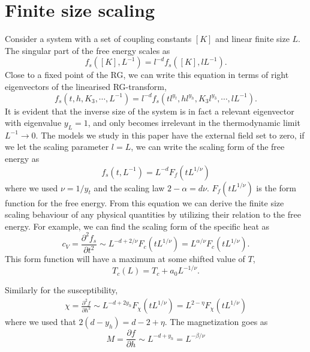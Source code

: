 \section{Finite size scaling}
Consider a system with a set of coupling constants $[K]$ and linear finite size $L$. 
The singular part of the free energy scales as
\begin{equation}
  f_s([K],L^{-1}) = l^{-d}f_s([K],lL^{-1}).
  \label{}
\end{equation}
Close to a fixed point of the RG, we can write this equation in terms of right eigenvectors of the linearised RG-transform,
\begin{equation}
  f_s(t,h,K_3,\cdots,L^{-1}) = l^{-d}f_s(tl^{y_t},hl^{y_h},K_3 l^{y_3},\cdots,lL^{-1}).
  \label{}
\end{equation}
It is evident that the inverse size of the system is in fact a relevant eigenvector with eigenvalue $y_L = 1$, and only becomes irrelevant in the thermodynamic limit $L^{-1}\rightarrow 0$.
The models we study in this paper have the external field set to zero, if we let the scaling parameter $l = L$, we can write the scaling form of the free energy as
\begin{equation}
  f_s(t,L^{-1}) = L^{-d} F_f(t L^{1/\nu})
  \label{}
\end{equation}
where we used $\nu = 1/y_t$ and the scaling law $2 -\alpha = d\nu$.
$F_f(tL^{1/\nu})$ is the form function for the free energy.
From this equation we can derive the finite size scaling behaviour of any physical quantities by utilizing their relation to the free energy. 
For example, we can find the scaling form of the specific heat as
\begin{equation}
  c_V = \frac{\partial ^2 f_s}{\partial t^2} \sim L^{-d +2/\nu}F_{c}(tL^{1/\nu}) = L^{\alpha/\nu} F_{c}(tL^{1/\nu}).
  \label{}
\end{equation}
This form function will have a maximum at some shifted value of $T$, 
\begin{equation}
  T_c(L) = T_c +  a_0 L^{-1/\nu}.
  \label{}
\end{equation}


Similarly for the susceptibility,
\begin{align}
  \chi = \frac{\partial^2 f}{\partial h^2}
  \sim L^{-d +2y_h}F_{\chi}(tL^{1/\nu}) = L^{2-\eta}F_{\chi}(tL^{1/\nu})
  \label{}
\end{align}
where we used that $ 2(d-y_h) = d -2 +\eta$.
The magnetization goes as
\begin{equation}
  M = \frac{\partial f}{\partial h} \sim L^{-d + y_h} = L^{-\beta/\nu}
  \label{}
\end{equation}

